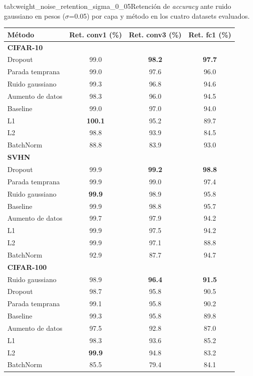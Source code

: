 \begin{table}{tab:weight_noise_retention_sigma_0_05}{Retención de \textit{accuracy} ante ruido gaussiano en pesos ($\sigma$=0.05) por capa y método en los cuatro datasets evaluados.}
\small
\begin{tabular}{lccc}
\toprule
\textbf{Método} & \textbf{Ret. conv1 (\%)} & \textbf{Ret. conv3 (\%)} & \textbf{Ret. fc1 (\%)} \\
\midrule
\multicolumn{4}{l}{\textbf{CIFAR-10}}\\
\midrule
Dropout & 99.0 & \textbf{98.2} & \textbf{97.7} \\
Parada temprana & 99.0 & 97.6 & 96.0 \\
Ruido gaussiano & 99.3 & 96.8 & 94.6 \\
Aumento de datos & 98.3 & 96.0 & 94.5 \\
Baseline & 99.0 & 97.0 & 94.0 \\
L1 & \textbf{100.1} & 95.2 & 89.7 \\
L2 & 98.8 & 93.9 & 84.5 \\
BatchNorm & 88.8 & 83.9 & 93.0 \\
\midrule
\multicolumn{4}{l}{\textbf{SVHN}}\\
\midrule
Dropout & 99.9 & \textbf{99.2} & \textbf{98.8} \\
Parada temprana & 99.9 & 99.0 & 97.4 \\
Ruido gaussiano & \textbf{99.9} & 98.9 & 95.8 \\
Baseline & 99.9 & 98.8 & 95.7 \\
Aumento de datos & 99.7 & 97.9 & 94.2 \\
L1 & 99.9 & 97.5 & 94.2 \\
L2 & 99.9 & 97.1 & 88.8 \\
BatchNorm & 92.9 & 87.7 & 94.7 \\
\midrule
\multicolumn{4}{l}{\textbf{CIFAR-100}}\\
\midrule
Ruido gaussiano & 98.9 & \textbf{96.4} & \textbf{91.5} \\
Dropout & 98.7 & 95.8 & 90.5 \\
Parada temprana & 99.1 & 95.8 & 90.2 \\
Baseline & 99.3 & 95.8 & 89.8 \\
Aumento de datos & 97.5 & 92.8 & 87.0 \\
L1 & 98.3 & 93.6 & 85.2 \\
L2 & \textbf{99.9} & 94.8 & 83.2 \\
BatchNorm & 85.5 & 79.4 & 84.1 \\
\midrule

\end{tabular}
\end{table}
